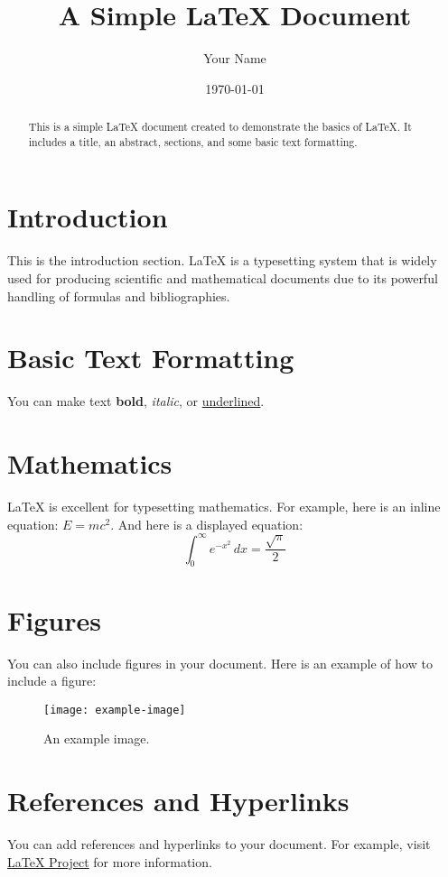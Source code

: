 \documentclass{article}
\title{A Simple LaTeX Document}
\author{Your Name}
\date{\today}
\begin{document}
\maketitle

\begin{abstract}
This is a simple LaTeX document created to demonstrate the basics of LaTeX. It includes a title, an abstract, sections, and some basic text formatting.
\end{abstract}

\section{Introduction}
This is the introduction section. LaTeX is a typesetting system that is widely used for producing scientific and mathematical documents due to its powerful handling of formulas and bibliographies.

\section{Basic Text Formatting}
You can make text \textbf{bold}, \textit{italic}, or \underline{underlined}.

\section{Mathematics}
LaTeX is excellent for typesetting mathematics. For example, here is an inline equation: \( E = mc^2 \). And here is a displayed equation:
\[
\int_0^\infty e^{-x^2} \, dx = \frac{\sqrt{\pi}}{2}
\]

\section{Figures}
You can also include figures in your document. Here is an example of how to include a figure:
\begin{figure}[h]
    \centering
    \texttt{[image: example-image]}
    \caption{An example image.}
    \label{fig:example}
\end{figure}

\section{References and Hyperlinks}
You can add references and hyperlinks to your document. For example, visit \href{https://www.latex-project.org/}{LaTeX Project} for more information.
\end{document}
